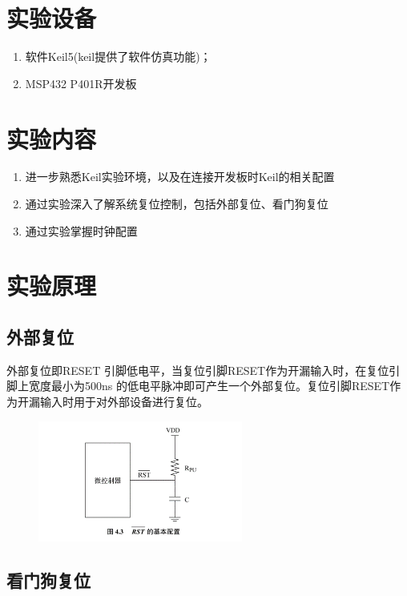 \documentclass[a4paper,10pt,UTF8]{paper}
\numberwithin{equation}{section}
\numberwithin{figure}{section}
\begin{document}
\section{实验设备}

\begin{enumerate}
  \item 软件Keil5(keil提供了软件仿真功能)；
  \item MSP432 P401R开发板
\end{enumerate}

\section{实验内容}

\begin{enumerate}
  \item 进一步熟悉Keil实验环境，以及在连接开发板时Keil的相关配置
  \item 通过实验深入了解系统复位控制，包括外部复位、看门狗复位
  \item 通过实验掌握时钟配置
\end{enumerate}


\section{实验原理}

\subsection{外部复位}

外部复位即RESET 引脚低电平，当复位引脚RESET作为开漏输入时，在复位引脚上宽度最小为500ns 的低电平脉冲即可产生一个外部复位。复位引脚RESET作为开漏输入时用于对外部设备进行复位。

\begin{figure}[h]
  \centering
  \includegraphics[width=0.6\textwidth]{1.png}
  \caption{}
  \label{}
\end{figure}

\subsection{看门狗复位}
\end{document}
